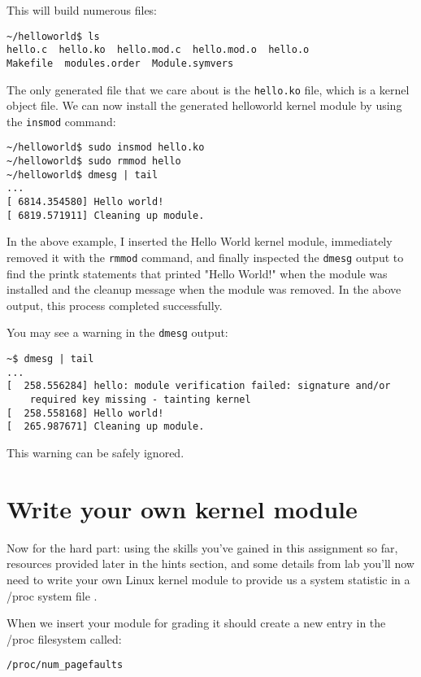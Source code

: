 \documentclass[11pt]{article}
\begin{document}
\newpage

This will build numerous files:

\begin{verbatim}
~/helloworld$ ls
hello.c  hello.ko  hello.mod.c  hello.mod.o  hello.o  
Makefile  modules.order  Module.symvers
\end{verbatim}

The only generated file that we care about is the \texttt{hello.ko} file, which is a kernel object file. We can now install the generated helloworld kernel module by using the \texttt{insmod} command:

\begin{verbatim}
~/helloworld$ sudo insmod hello.ko
~/helloworld$ sudo rmmod hello
~/helloworld$ dmesg | tail
...
[ 6814.354580] Hello world!
[ 6819.571911] Cleaning up module.
\end{verbatim}

In the above example, I inserted the Hello World kernel module, immediately removed it with the \texttt {rmmod} command, and finally inspected the \texttt{dmesg} output to find the printk statements that printed "Hello World!" when the module was installed and the cleanup message when the module was removed. In the above output, this process completed successfully.

You may see a warning in the \texttt{dmesg} output:

\begin{verbatim}
~$ dmesg | tail
...
[  258.556284] hello: module verification failed: signature and/or  
	required key missing - tainting kernel
[  258.558168] Hello world!
[  265.987671] Cleaning up module.
\end{verbatim}

This warning can be safely ignored.

\section*{Write your own kernel module}

Now for the hard part: using the skills you've gained in this assignment so far, resources provided later in the hints section, and some details from lab you'll now need to write your own Linux kernel module to provide us a system statistic in a /proc system file \cite{cse551}. 

When we insert your module for grading it should create a new entry in the /proc filesystem called:

\begin{verbatim}
/proc/num_pagefaults
\end{verbatim}
\end{document}
